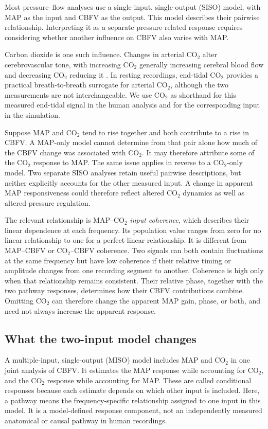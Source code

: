 \documentclass[12pt]{article}
\begin{document}
Most pressure--flow analyses use a single-input, single-output (SISO) model,
with MAP as the input and CBFV as the output. This model describes their
pairwise relationship. Interpreting it as a separate pressure-related response
requires considering whether another influence on CBFV also varies with MAP.

Carbon dioxide is one such influence. Changes in arterial CO$_2$ alter
cerebrovascular tone, with increasing CO$_2$ generally increasing cerebral
blood flow and decreasing CO$_2$ reducing it \cite{Hoiland2019}. In resting
recordings, end-tidal CO$_2$ provides a practical breath-to-breath surrogate
for arterial CO$_2$, although the two measurements are not interchangeable.
We use CO$_2$ as shorthand for this measured end-tidal signal in the human
analysis and for the corresponding input in the simulation.

Suppose MAP and CO$_2$ tend to rise together and both contribute to a rise in
CBFV. A MAP-only model cannot determine from that pair alone how much of the
CBFV change was associated with CO$_2$. It may therefore attribute some of
the CO$_2$ response to MAP. The same issue applies in reverse to a CO$_2$-only
model. Two separate SISO analyses retain useful pairwise descriptions, but
neither explicitly accounts for the other measured input. A change in apparent
MAP responsiveness could therefore reflect altered CO$_2$ dynamics as well as
altered pressure regulation.

The relevant relationship is MAP--CO$_2$ \emph{input coherence}, which
describes their linear dependence at each frequency. Its population value
ranges from zero for no linear relationship to one for a perfect linear
relationship. It is different from MAP--CBFV or CO$_2$--CBFV coherence.
Two signals can both contain fluctuations at the same frequency but have low
coherence if their relative timing or amplitude changes from one recording
segment to another. Coherence is high only when that relationship remains
consistent. Their relative phase, together with the two pathway responses,
determines how their CBFV contributions combine. Omitting CO$_2$ can therefore
change the apparent MAP gain, phase, or both, and need not always increase the
apparent response.

\subsection{What the two-input model changes}

A multiple-input, single-output (MISO) model includes MAP and CO$_2$ in one
joint analysis of CBFV. It estimates the MAP response while accounting for
CO$_2$, and the CO$_2$ response while accounting for MAP. These are called
conditional responses because each estimate depends on which other input is
included. Here, a pathway means the frequency-specific relationship assigned
to one input in this model. It is a model-defined response component, not an
independently measured anatomical or causal pathway in human recordings.
\end{document}
